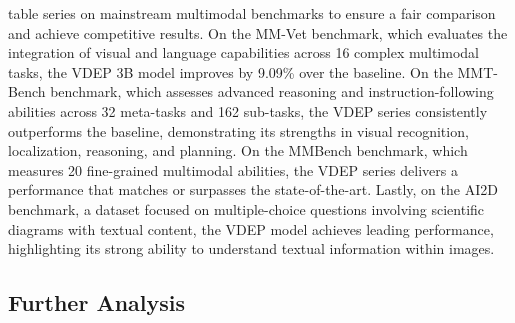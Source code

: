 {table}
series on mainstream multimodal benchmarks to ensure a fair comparison and achieve competitive results.
On the MM-Vet benchmark, which evaluates the integration of visual and language capabilities across 16 complex multimodal tasks, the VDEP 3B model improves by 9.09\% over the baseline. On the MMT-Bench benchmark, which assesses advanced reasoning and instruction-following abilities across 32 meta-tasks and 162 sub-tasks, the VDEP series consistently outperforms the baseline, demonstrating its strengths in visual recognition, localization, reasoning, and planning. On the MMBench benchmark, which measures 20 fine-grained multimodal abilities, the VDEP series delivers a performance that matches or surpasses the state-of-the-art.
Lastly, on the AI2D benchmark, a dataset focused on multiple-choice questions involving scientific diagrams with textual content, the VDEP model achieves leading performance, highlighting its strong ability to understand textual information within images.






\subsection{Further Analysis}

